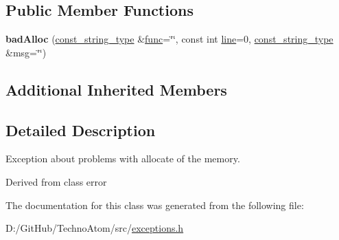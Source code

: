 \subsection*{Public Member Functions}
\begin{DoxyCompactItemize}
\item 
\mbox{\label{classatom_1_1bad_alloc_afcf798fbb60d759728033cd30c01b0e8}} 
{\bfseries bad\+Alloc} (\hyperlink{classatom_1_1error_ac330e9fb7cedcf4a173c5eb156d7bdaf}{const\+\_\+string\+\_\+type} \&\hyperlink{classatom_1_1error_a0a70a92b1638bfe4be7972651ae0c5c8}{func}=\char`\"{}\char`\"{}, const int \hyperlink{classatom_1_1error_aa9443d1a458d0dc6086372444a58e8c6}{line}=0, \hyperlink{classatom_1_1error_ac330e9fb7cedcf4a173c5eb156d7bdaf}{const\+\_\+string\+\_\+type} \&msg=\char`\"{}\char`\"{})
\end{DoxyCompactItemize}
\subsection*{Additional Inherited Members}


\subsection{Detailed Description}
Exception about problems with allocate of the memory. 

Derived from class error 

The documentation for this class was generated from the following file\+:\begin{DoxyCompactItemize}
\item 
D\+:/\+Git\+Hub/\+Techno\+Atom/src/\hyperlink{exceptions_8h}{exceptions.\+h}\end{DoxyCompactItemize}
